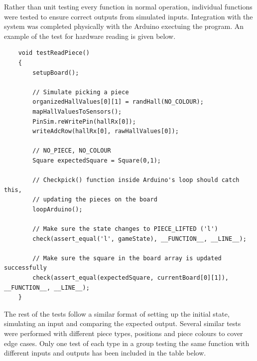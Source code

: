 \documentclass[12pt, titlepage]{article}
\begin{document}
  Rather than unit testing every function in normal operation, individual functions were tested to ensure correct outputs from simulated inputs. Integration 
  with the system was completed physically with the Arduino exectuing the program. An example of the test for hardware reading is given below. 
  \newpage 
\begin{lstlisting}
    void testReadPiece()
    {
        setupBoard(); 
        
        // Simulate picking a piece 
        organizedHallValues[0][1] = randHall(NO_COLOUR);  
        mapHallValuesToSensors(); 
        PinSim.reWritePin(hallRx[0]); 
        writeAdcRow(hallRx[0], rawHallValues[0]); 

        // NO_PIECE, NO_COLOUR 
        Square expectedSquare = Square(0,1);    

        // Checkpick() function inside Arduino's loop should catch this,
        // updating the pieces on the board 
        loopArduino();  

        // Make sure the state changes to PIECE_LIFTED ('l')
        check(assert_equal('l', gameState), __FUNCTION__, __LINE__);  

        // Make sure the square in the board array is updated successfully
        check(assert_equal(expectedSquare, currentBoard[0][1]), __FUNCTION__, __LINE__);  
    }
\end{lstlisting}

  The rest of the tests follow a similar format of setting up the initial state, simulating an input and comparing the expected output. Several similar tests were 
  performed with different piece types, positions and piece colours to cover edge cases. Only one test of each type in a group testing the same function with 
  different inputs and outputs has been included in the table below.
\end{document}
